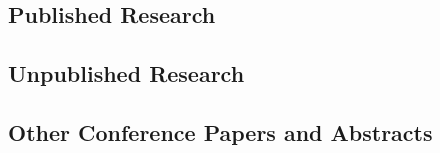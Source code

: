 
\subsection*{Published Research}
\label{published-research}
\newrefcontext
{}

\subsection*{Unpublished Research}
\label{unpublished-research}
\newrefcontext
{}

\subsection*{Other Conference Papers and Abstracts}
\label{other-conference-papers}
\newrefcontext
{}
